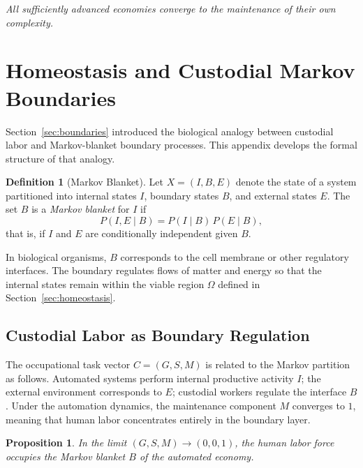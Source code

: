 \documentclass[12pt,a4paper]{article}
\theoremstyle{plain}
\newtheorem{proposition}[theorem]{Proposition}
\theoremstyle{definition}
\newtheorem{definition}[theorem]{Definition}
\theoremstyle{remark}
\begin{document}
\bigskip

\begin{center}
\textit{All sufficiently advanced economies converge to the maintenance of
their own complexity.}
\end{center}

\section{Homeostasis and Custodial Markov Boundaries}
\label{app:markov}

Section~\ref{sec:boundaries} introduced the biological analogy between
custodial labor and Markov-blanket boundary processes.  This appendix
develops the formal structure of that analogy.

\begin{definition}[Markov Blanket]
Let $X = (I, B, E)$ denote the state of a system partitioned into internal
states $I$, boundary states $B$, and external states $E$.  The set $B$ is a
\emph{Markov blanket} for $I$ if
\[
P(I, E \mid B) = P(I \mid B)\, P(E \mid B),
\]
that is, if $I$ and $E$ are conditionally independent given $B$.
\end{definition}

In biological organisms, $B$ corresponds to the cell membrane or other
regulatory interfaces.  The boundary regulates flows of matter and energy so
that the internal states remain within the viable region $\Omega$ defined in
Section~\ref{sec:homeostasis}.

\subsection{Custodial Labor as Boundary Regulation}

The occupational task vector $C = (G, S, M)$ is related to the Markov
partition as follows.  Automated systems perform internal productive activity
$I$; the external environment corresponds to $E$; custodial workers regulate
the interface $B$.  Under the automation dynamics, the maintenance component
$M$ converges to $1$, meaning that human labor concentrates entirely in the
boundary layer.

\begin{proposition}
In the limit $(G, S, M) \to (0, 0, 1)$, the human labor force occupies
the Markov blanket $B$ of the automated economy.
\end{proposition}
\end{document}
